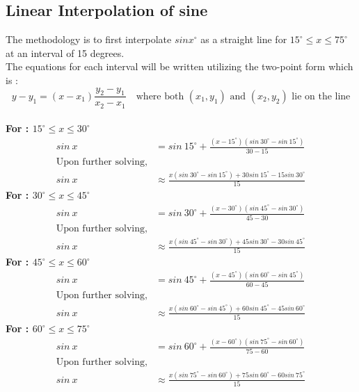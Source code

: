 \documentclass[12pt,twoside, letterpaper, margin=1in]{article}
\begin{document}
\subsection{Linear Interpolation of sine}
The methodology is to first interpolate $sinx^\circ$ as a straight line for $15^\circ \leq x \leq 75^\circ$ at an interval of 15 degrees. 
\\
The equations for each interval will be written utilizing the two-point form which is : \\
$$
y - y_1=(x-x_1)\frac{y_2-y_1}{x_2 - x_1} \quad \text{where both $(x_1,y_1)$ and $(x_2, y_2)$ lie on the line}
$$
\\
\textbf{For : $15^\circ \leq x \leq 30^\circ$ }
\begin{align}
sin~x &= sin~15^\circ +\frac{(x-15^\circ)(sin~30^\circ -sin~15^\circ)}{30-15} \nonumber
\\
\text{Upon further solving,} \nonumber
\\
sin~x &\approx \frac{x(sin~30^\circ - sin~15^\circ) + 30sin~15^\circ -15 sin~30^\circ}{15}  \label{1}
\end{align}
\textbf{For : $30^\circ \leq x \leq 45^\circ$ }\\
\begin{align}
sin~x &= sin~30^\circ +\frac{(x-30^\circ)(sin~45^\circ -sin~30^\circ)}{45-30} \nonumber
\\
\text{Upon further solving,} \nonumber
\\
sin~x &\approx \frac{x(sin~45^\circ - sin~30^\circ) + 45sin~30^\circ -30 sin~45^\circ}{15} \label{2}
\end{align}
\textbf{For : $45^\circ \leq x \leq 60^\circ$ }\\
\begin{align}
sin~x &= sin~45^\circ +\frac{(x-45^\circ)(sin~60^\circ -sin~45^\circ)}{60-45} \nonumber
\\
\text{Upon further solving,} \nonumber
\\
sin~x &\approx \frac{x(sin~60^\circ - sin~45^\circ) + 60sin~45^\circ -45 sin~60^\circ}{15} \label{3}
\end{align}
\textbf{For : $60^\circ \leq x \leq 75^\circ$ }\\
\begin{align}
sin~x &= sin~60^\circ +\frac{(x-60^\circ)(sin~75^\circ -sin~60^\circ)}{75-60} \nonumber
\\
\text{Upon further solving,} \nonumber
\\
sin~x &\approx \frac{x(sin~75^\circ - sin~60^\circ) + 75sin~60^\circ -60 sin~75^\circ}{15} \label{4}
\end{align}
\end{document}
